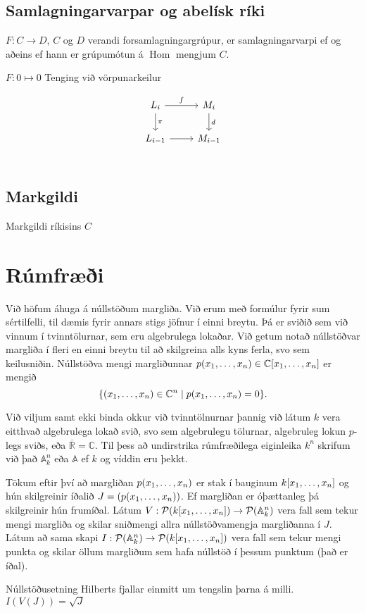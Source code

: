 \documentclass[a4paper, 14pt]{article}
\DeclareMathOperator{\Hom}{Hom}
\newcommand{\C}{\mathbb{C}}
\newcommand{\R}{\mathbb{R}}
\newcommand{\A}{\mathbb{A}}
\renewcommand{\P}{\mathcal{P}}
\begin{document}
\subsection{Samlagningarvarpar og abelísk ríki}
$F: C \to D$, $C$ og $D$ verandi forsamlagningargrúpur, er samlagningarvarpi ef og aðeins ef hann er grúpumótun á $\Hom$ mengjum $C$.

$F: 0 \mapsto 0$
Tenging við vörpunarkeilur

\[
    \begin{tikzcd}
    L_i \arrow{r}{f} \arrow{d}{\pi} & M_i \arrow{d}{d} \\
    L_{i-1} \arrow{r}{} & M_{i-1} \\
    \end{tikzcd}
\]

\subsection{Markgildi}
Markgildi ríkisins $C$

\section{Rúmfræði}
Við höfum áhuga á núllstöðum margliða. Við erum með formúlur fyrir sum sértilfelli, til dæmis fyrir annars stigs jöfnur 
í einni breytu. Þá er sviðið sem við vinnum í tvinntölurnar, sem eru algebrulega lokaðar. Við getum notað núllstöðvar margliða í 
fleri en einni breytu til að skilgreina alls kyns ferla, svo sem keilusniðin. Núllstöðva mengi margliðunnar 
$p(\xs) \in \C[\xs]$ er mengið 
\[
    \{ (\xs) \in \C^n \mid p(\xs) = 0 \}.
\]

Við viljum samt ekki binda okkur við tvinntölnurnar þannig við látum $k$ vera eitthvað algebrulega lokað svið,
svo sem algebrulegu tölurnar, algebruleg lokun $p$-legs sviðs, eða $\overline{\R} = \C$. Til þess að undirstrika 
rúmfræðilega eiginleika $k^n$ skrifum við það $\A_k^n$ eða $\A$ ef $k$ og víddin eru þekkt.

Tökum eftir því að margliðan $p(\xs)$ er stak í bauginum $k[\xs]$ og hún skilgreinir íðalið $J = (p(\xs))$.
Ef margliðan er óþættanleg þá skilgreinir hún frumíðal. Látum $V : \P(k[\xs]) 
\to \P(\A^n_k)$ vera fall sem tekur mengi margliða og skilar sniðmengi allra núllstöðvamengja margliðanna í $J$. 
Látum að sama skapi $I : \P(\A_k^n) \to \P(k[\xs])$ vera fall sem tekur mengi punkta og skilar öllum
margliðum sem hafa núllstöð í þessum punktum (það er íðal).


Núllstöðusetning Hilberts fjallar einmitt um tengslin þarna á milli. $I(V(J)) = \sqrt{J}$
\end{document}
